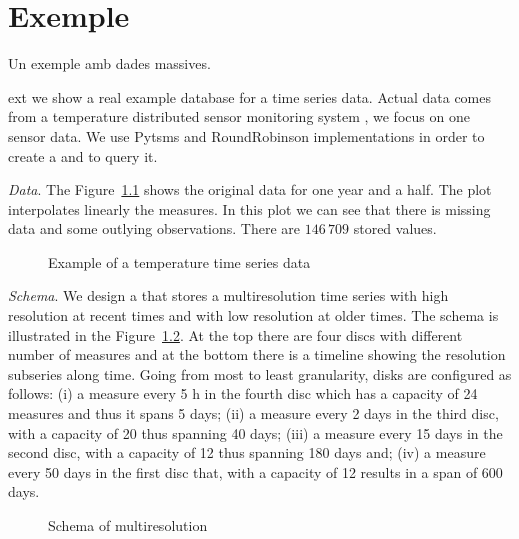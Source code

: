 \chapter{Exemple}
\label{sec:implementacions:exemple}

Un exemple amb dades massives.




ext we show a real example database for a time series data. Actual
data comes from a temperature distributed sensor monitoring system
\cite{alippi10}, we focus on one sensor data. We use Pytsms and
RoundRobinson implementations in order to create a  and
to query it.

\emph{Data}. The Figure~\ref{fig:exemple:original} shows the original
data for one year and a half. The plot interpolates linearly the
measures. In this plot we can see that there is missing data and some
outlying observations. There are $146\,709$ stored values.



\begin{figure}[tp]
  \centering
  
  \caption{Example of a temperature time series data}
  \label{fig:exemple:original}
\end{figure}



\emph{Schema}. We design a  that stores a multiresolution
time series with high resolution at recent times and with low
resolution at older times. The schema is illustrated in the
Figure~\ref{fig:exemple:window}. At the top there are four discs with
different number of measures and at the bottom there is a timeline
showing the resolution subseries along time. Going from most to least
granularity, disks are configured as follows: (i) a measure every 5 h
in the fourth disc which has a capacity of 24 measures and thus it
spans 5 days; (ii) a measure every 2 days in the third disc, with a
capacity of 20 thus spanning 40 days; (iii) a measure every 15 days in
the second disc, with a capacity of 12 thus spanning 180 days and;
(iv) a measure every 50 days in the first disc that, with a capacity
of 12 results in a span of 600 days.


\begin{figure}[tp]
  \centering
  \setlength{\unitlength}{1.3mm}
  
  \caption{Schema of multiresolution}
  \label{fig:exemple:window}
\end{figure}

